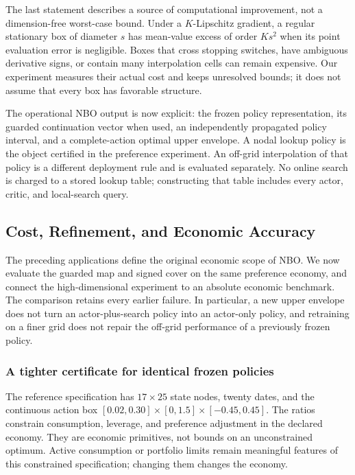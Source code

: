 \documentclass[ecta,nameyear,draft]{econsocart}
\theoremstyle{definition}
\theoremstyle{remark}
\begin{document}
The last statement describes a source of computational improvement, not a dimension-free worst-case bound. Under a $K$-Lipschitz gradient, a regular stationary box of diameter $s$ has mean-value excess of order $Ks^2$ when its point evaluation error is negligible. Boxes that cross stopping switches, have ambiguous derivative signs, or contain many interpolation cells can remain expensive. Our experiment measures their actual cost and keeps unresolved bounds; it does not assume that every box has favorable structure.

The operational NBO output is now explicit: the frozen policy representation, its guarded continuation vector when used, an independently propagated policy interval, and a complete-action optimal upper envelope. A nodal lookup policy is the object certified in the preference experiment. An off-grid interpolation of that policy is a different deployment rule and is evaluated separately. No online search is charged to a stored lookup table; constructing that table includes every actor, critic, and local-search query.



\subsection{Cost, Refinement, and Economic Accuracy}\label{sec:r9results}
The preceding applications define the original economic scope of NBO. We now evaluate the guarded map and signed cover on the same preference economy, and connect the high-dimensional experiment to an absolute economic benchmark. The comparison retains every earlier failure. In particular, a new upper envelope does not turn an actor-plus-search policy into an actor-only policy, and retraining on a finer grid does not repair the off-grid performance of a previously frozen policy.

\subsubsection{A tighter certificate for identical frozen policies}
The reference specification has $17\times25$ state nodes, twenty dates, and the continuous action box $[0.02,0.30]\times[0,1.5]\times[-0.45,0.45]$. The ratios constrain consumption, leverage, and preference adjustment in the declared economy. They are economic primitives, not bounds on an unconstrained optimum. Active consumption or portfolio limits remain meaningful features of this constrained specification; changing them changes the economy.
\end{document}
